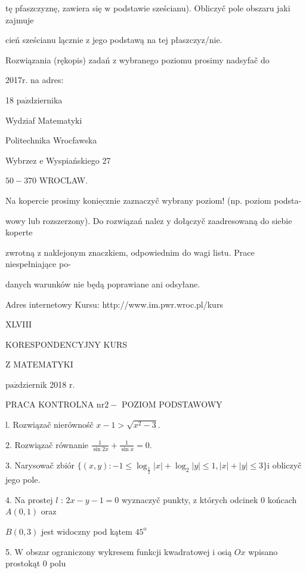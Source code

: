 \documentclass[a4paper,12pt]{article}
\begin{document}
tę pfaszczyznę, zawiera się $\mathrm{w}$ podstawie sześcianu). Obliczyč pole obszaru jaki zajmuje

cień sześcianu lącznie $\mathrm{z}$ jego podstawą na tej płaszczyz/nie.

Rozwiązania (rękopis) zadań z wybranego poziomu prosimy nadsyfač do

2017r. na adres:

18 $\mathrm{p}\mathrm{a}\acute{\mathrm{z}}$dziernika

Wydziaf Matematyki

Politechnika Wrocfawska

Wybrzez $\mathrm{e}$ Wyspiańskiego 27

$50-370$ WROCLAW.

Na kopercie prosimy $\underline{\mathrm{k}\mathrm{o}\mathrm{n}\mathrm{i}\mathrm{e}\mathrm{c}\mathrm{z}\mathrm{n}\mathrm{i}\mathrm{e}}$ zaznaczyč wybrany poziom! (np. poziom podsta-

wowy lub rozszerzony). Do rozwiązań nalez $\mathrm{y}$ dołączyč zaadresowaną do siebie koperte

zwrotną $\mathrm{z}$ naklejonym znaczkiem, odpowiednim do wagi listu. Prace niespełniające po-

danych warunków nie będą poprawiane ani odsyłane.

Adres internetowy Kursu: http://www.im.pwr.wroc.pl/kurs







XLVIII

KORESPONDENCYJNY KURS

Z MATEMATYKI

$\mathrm{p}\mathrm{a}\acute{\mathrm{z}}$dziernik 2018 $\mathrm{r}.$

PRACA KONTROLNA $\mathrm{n}\mathrm{r} 2-$ POZIOM PODSTAWOWY

l. Rozwiązač nierównośč $x-1>\sqrt{x^{2}-3}.$

2. Rozwiązač równanie $\displaystyle \frac{1}{\sin 2x}+\frac{1}{\sin x}=0.$

3. Narysowač zbiór $\{(x,y):-1\leq\log_{\frac{1}{2}}|x|+\log_{2}|y|\leq 1,|x|+|y|\leq 3\}\mathrm{i}$ obliczyč jego pole.

4. Na prostej $l$ : $2x-y-1=0$ wyznaczyč punkty, $\mathrm{z}$ których odcinek $0$ końcach $A(0,1)$ oraz

$B(0,3)$ jest widoczny pod kątem $45^{\mathrm{o}}$

5. $\mathrm{W}$ obszar ograniczony wykresem funkcji kwadratowej $\mathrm{i}$ osią $Ox$ wpisano prostokąt $0$ polu
\end{document}
